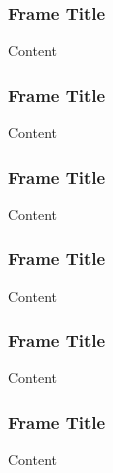 \documentclass{beamer}
\begin{document}
\begin{frame}\frametitle{Frame Title}
\centering
Content
\end{frame}

\begin{frame}\frametitle{Frame Title}
\centering
Content
\end{frame}

\begin{frame}\frametitle{Frame Title}
\centering
Content
\end{frame}

\begin{frame}\frametitle{Frame Title}
\centering
Content
\end{frame}

\begin{frame}\frametitle{Frame Title}
\centering
Content
\end{frame}

\begin{frame}\frametitle{Frame Title}
\centering
Content
\end{frame}
\end{document}
